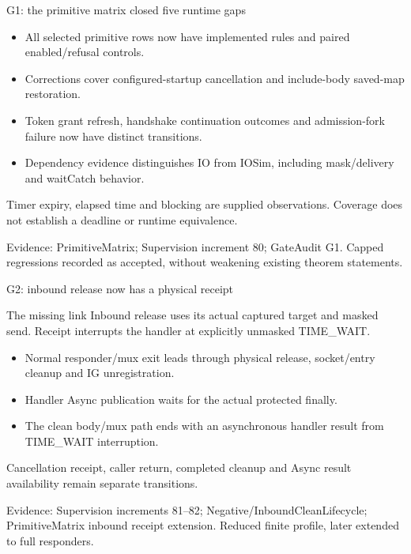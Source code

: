 \documentclass[11pt,aspectratio=169]{beamer}
\newcommand{\evidence}[1]{\vfill{\fontsize{7}{8}\selectfont\color{Muted}Evidence: #1\par}}
\begin{document}
\begin{frame}{G1: the primitive matrix closed five runtime gaps}
\begin{itemize}\setlength\itemsep{2.5mm}
\item All selected primitive rows now have implemented rules and paired enabled/refusal controls.
\item Corrections cover configured-startup cancellation and include-body saved-map restoration.
\item Token grant refresh, handshake continuation outcomes and admission-fork failure now have distinct transitions.
\item Dependency evidence distinguishes IO from IOSim, including mask/delivery and waitCatch behavior.
\end{itemize}\small Timer expiry, elapsed time and blocking are supplied observations. Coverage does not establish a deadline or runtime equivalence.
\evidence{PrimitiveMatrix; Supervision increment 80; GateAudit G1. Capped regressions recorded as accepted, without weakening existing theorem statements.}
\end{frame}

\begin{frame}{G2: inbound release now has a physical receipt}
\begin{block}{The missing link}
Inbound release uses its actual captured target and masked send. Receipt interrupts the handler at explicitly unmasked TIME\_WAIT.
\end{block}\begin{itemize}\setlength\itemsep{2.5mm}
\item Normal responder/mux exit leads through physical release, socket/entry cleanup and IG unregistration.
\item Handler Async publication waits for the actual protected finally.
\item The clean body/mux path ends with an asynchronous handler result from TIME\_WAIT interruption.
\end{itemize}\small Cancellation receipt, caller return, completed cleanup and Async result availability remain separate transitions.
\evidence{Supervision increments 81--82; Negative/InboundCleanLifecycle; PrimitiveMatrix inbound receipt extension. Reduced finite profile, later extended to full responders.}
\end{frame}
\end{document}
